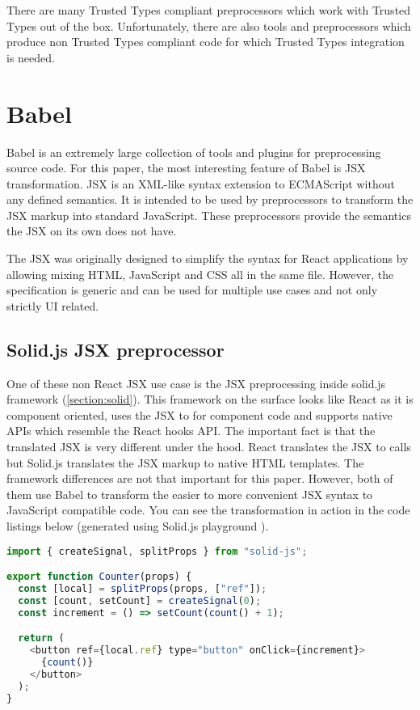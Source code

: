 There are many Trusted Types compliant preprocessors which work with Trusted Types out of the box.
Unfortunately, there are also tools and preprocessors which produce non Trusted Types compliant code
for which Trusted Types integration is needed.

\section{Babel}

Babel is an extremely large collection of tools and plugins for preprocessing source code. For this
paper, the most interesting feature of Babel is JSX transformation. JSX is an XML-like syntax
extension to ECMAScript without any defined semantics. It is intended to be used by preprocessors to
transform the JSX markup into standard JavaScript. These preprocessors provide the semantics the JSX
on its own does not have.

The JSX was originally designed to simplify the syntax for React applications by allowing mixing
HTML, JavaScript and CSS all in the same file. However, the specification \cite{jsx_spec} is
generic and can be used for multiple use cases and not only strictly UI related.

\subsection{Solid.js JSX preprocessor}
\label{jsx_solid_preprocessor}

One of these non React JSX use case is the JSX preprocessing inside solid.js framework
(\ref{section:solid}). This framework on the surface looks like React as it is component oriented,
uses the JSX to for component code and supports native APIs which resemble the React hooks API. The
important fact is that the translated JSX is very different under the hood. React translates the JSX
to  calls but Solid.js translates the JSX markup to native HTML templates.
The framework differences are not that important for this paper. However, both of them use Babel to
transform the easier to more convenient JSX syntax to JavaScript compatible code. You can see the
transformation in action in the code listings below (generated using Solid.js playground
\cite{solidjs_playground}).

\bigskip
\begin{lstlisting}[language=JavaScript, caption=Example of a component in Solid.js using JSX]
import { createSignal, splitProps } from "solid-js";

export function Counter(props) {
  const [local] = splitProps(props, ["ref"]);
  const [count, setCount] = createSignal(0);
  const increment = () => setCount(count() + 1);

  return (
    <button ref={local.ref} type="button" onClick={increment}>
      {count()}
    </button>
  );
}
\end{lstlisting}

